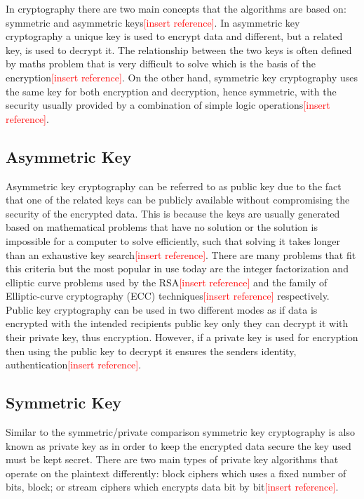 \documentclass[12pt,twoside,a4paper]{report}
\begin{document}
    In cryptography there are two main concepts that the algorithms are based on: symmetric and asymmetric keys\textcolor{red}{[insert reference]}.
    In asymmetric key cryptography a unique key is used to encrypt data and different, but a related key, is used to decrypt it.
    The relationship between the two keys is often defined by maths problem that is very difficult to solve which is the basis of the encryption\textcolor{red}{[insert reference]}.
    On the other hand, symmetric key cryptography uses the same key for both encryption and decryption, hence symmetric, with the security usually provided by a combination of simple logic operations\textcolor{red}{[insert reference]}.
    
    \subsection{Asymmetric Key}
    Asymmetric key cryptography can be referred to as public key due to the fact that one of the related keys can be publicly available without compromising the security of the encrypted data.
    This is because the keys are usually generated based on mathematical problems that have no solution or the solution is impossible for a computer to solve efficiently, such that solving it takes longer than an exhaustive key search\textcolor{red}{[insert reference]}.
    There are many problems that fit this criteria but the most popular in use today are the integer factorization and elliptic curve problems used by the RSA\textcolor{red}{[insert reference]} and the family of Elliptic-curve cryptography (ECC) techniques\textcolor{red}{[insert reference]} respectively.
    Public key cryptography can be used in two different modes as if data is encrypted with the intended recipients public key only they can decrypt it with their private key, thus encryption.
    However, if a private key is used for encryption then using the public key to decrypt it ensures the senders identity, authentication\textcolor{red}{[insert reference]}.
    
    \subsection{Symmetric Key}
    Similar to the symmetric/private comparison symmetric key cryptography is also known as private key as in order to keep the encrypted data secure the key used must be kept secret. There are two main types of private key algorithms that operate on the plaintext differently: block ciphers which uses a fixed number of bits, block; or stream ciphers which encrypts data bit by bit\textcolor{red}{[insert reference]}.
    
\end{document}
